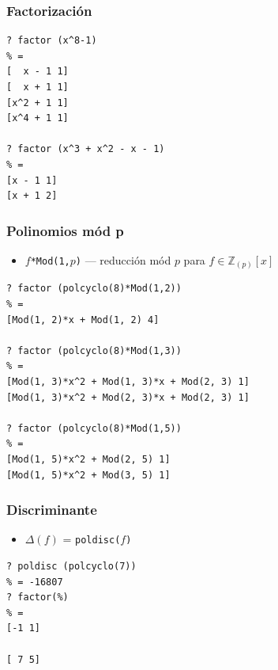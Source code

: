 \documentclass{beamer}
\newcommand{\ZZ}{\mathbb{Z}}
\begin{document}

\begin{frame}[fragile]
  \frametitle{Factorización}

  \begin{shaded}\small
\begin{verbatim}
? factor (x^8-1)
% = 
[  x - 1 1]
[  x + 1 1]
[x^2 + 1 1]
[x^4 + 1 1]

? factor (x^3 + x^2 - x - 1)
% = 
[x - 1 1]
[x + 1 2]
\end{verbatim}
  \end{shaded}
\end{frame}


\begin{frame}[fragile]
  \frametitle{Polinomios mód p}

  \begin{itemize}
    \item \texttt{$f$*Mod(1,$p$)} --- reducción mód $p$ para $f \in \ZZ_{(p)} [x]$
  \end{itemize}

  \begin{shaded}\small
\begin{verbatim}
? factor (polcyclo(8)*Mod(1,2))
% = 
[Mod(1, 2)*x + Mod(1, 2) 4]

? factor (polcyclo(8)*Mod(1,3))
% = 
[Mod(1, 3)*x^2 + Mod(1, 3)*x + Mod(2, 3) 1]
[Mod(1, 3)*x^2 + Mod(2, 3)*x + Mod(2, 3) 1]

? factor (polcyclo(8)*Mod(1,5))
% = 
[Mod(1, 5)*x^2 + Mod(2, 5) 1]
[Mod(1, 5)*x^2 + Mod(3, 5) 1]
\end{verbatim}
  \end{shaded}
\end{frame}


\begin{frame}[fragile]
  \frametitle{Discriminante}

  \begin{itemize}
  \item $\Delta (f)$ = \texttt{poldisc($f$)}
  \end{itemize}

  \begin{shaded}
\begin{verbatim}
? poldisc (polcyclo(7))
% = -16807
? factor(%)
% = 
[-1 1]

[ 7 5]
\end{verbatim}
  \end{shaded}
\end{frame}
\end{document}
